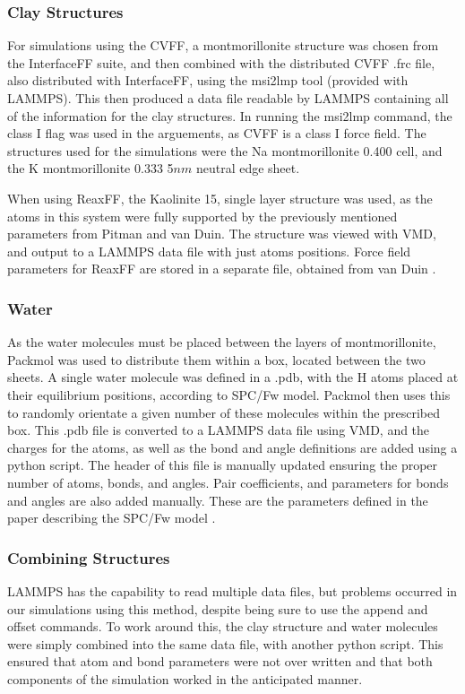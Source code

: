 			\subsubsection{Clay Structures}
				For simulations using the CVFF, a montmorillonite structure was chosen from the InterfaceFF suite, and then combined with the distributed CVFF .frc file, also distributed with InterfaceFF, using the msi2lmp tool (provided with LAMMPS). This then produced a data file readable by LAMMPS containing all of the information for the clay structures. In running the msi2lmp command, the class I flag was used in the arguements, as CVFF is a class I force field. The structures used for the simulations were the Na montmorillonite 0.400 cell, and the K montmorillonite 0.333 5$nm$ neutral edge sheet.
				
				When using ReaxFF, the Kaolinite 15, single layer structure was used, as the atoms in this system were fully supported by the previously mentioned parameters from Pitman and van Duin. The structure was viewed with VMD, and output to a LAMMPS data file with just atoms positions. Force field parameters for ReaxFF are stored in a separate file, obtained from van Duin \cite{pitman2012dynamics}.
				
			\subsubsection{Water}
				As the water molecules must be placed between the layers of montmorillonite, Packmol was used to distribute them within a box, located between the two sheets. A single water molecule was defined in a .pdb, with the H atoms placed at their equilibrium positions, according to SPC/Fw model. Packmol then uses this to randomly orientate a given number of these molecules within the prescribed box. This .pdb file is converted to a LAMMPS data file using VMD, and the charges for the atoms, as well as the bond and angle definitions are added using a python script. The header of this file is manually updated ensuring the proper number of atoms, bonds, and angles. Pair coefficients, and parameters for bonds and angles are also added manually. These are the parameters defined in the paper describing the SPC/Fw model \cite{wu2006flexible}.
				
			\subsubsection{Combining Structures}
				LAMMPS has the capability to read multiple data files, but problems occurred in our simulations using this method, despite being sure to use the append and offset commands. To work around this, the clay structure and water molecules were simply combined into the same data file, with another python script. This ensured that atom and bond parameters were not over written and that both components of the simulation worked in the anticipated manner.
				
